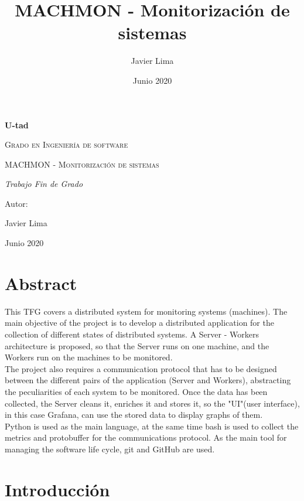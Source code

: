 \documentclass[ spanish, a4paper, 12pt, oneside]{report}
\title{\Huge MACHMON - Monitorización de sistemas }
\author{Javier Lima}
\date{Junio 2020}
\begin{document}
\begin{titlepage}
   \centering
   {\bfseries\LARGE U-tad \par}
   \vspace{1cm}
   {\scshape\Large Grado en Ingeniería de software \par}
   \vspace{3cm}
   {\scshape\Huge MACHMON - Monitorización de sistemas \par}
   \vspace{3cm}
   {\itshape\Large Trabajo Fin de Grado \par}
   \vfill
   {\Large Autor: \par}
   {\Large Javier Lima \par}
   \vfill
   {\Large Junio 2020 \par}
\end{titlepage}

\tableofcontents{}
\listoffigures
\newpage

\chapter{Abstract}


This TFG covers a distributed system for monitoring systems (machines). The main objective of the project is to develop a distributed application for 
the collection of different states of distributed systems. A Server - Workers architecture is proposed, so that the Server runs on one machine, and the Workers 
run on the machines to be monitored. \\

The project also requires a communication protocol that has to be designed between the different pairs of the application (Server and Workers), abstracting 
the peculiarities of each system to be monitored. Once the data has been collected, the Server cleans it, enriches it and stores it, so the "UI"(user interface), 
in this case Grafana, can use the stored data to display graphs of them. \\

Python is used as the main language, at the same time bash is used to collect the metrics and protobuffer for the communications protocol. As the main tool for 
managing the software life cycle, git and GitHub are used. \\

\chapter{Introducción}
\end{document}
